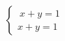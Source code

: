 \documentclass[preview]{standalone}
\begin{document}
\begin{align*}
\left\{ \begin{array}{cl} \ x + y = 1 \\[1pt] x + y = 1 \end{array} \right.
\end{align*}
\end{document}
